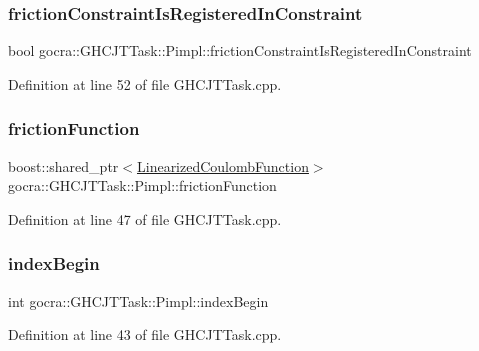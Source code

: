 \subsubsection{\texorpdfstring{friction\+Constraint\+Is\+Registered\+In\+Constraint}{frictionConstraintIsRegisteredInConstraint}}
{\footnotesize\ttfamily bool gocra\+::\+G\+H\+C\+J\+T\+Task\+::\+Pimpl\+::friction\+Constraint\+Is\+Registered\+In\+Constraint}



Definition at line 52 of file G\+H\+C\+J\+T\+Task.\+cpp.

\hypertarget{structgocra_1_1GHCJTTask_1_1Pimpl_a777d7f0a74a42508154b153dbc0a3b44}{}\label{structgocra_1_1GHCJTTask_1_1Pimpl_a777d7f0a74a42508154b153dbc0a3b44} 
\subsubsection{\texorpdfstring{friction\+Function}{frictionFunction}}
{\footnotesize\ttfamily boost\+::shared\+\_\+ptr$<$\hyperlink{classocra_1_1LinearizedCoulombFunction}{Linearized\+Coulomb\+Function}$>$ gocra\+::\+G\+H\+C\+J\+T\+Task\+::\+Pimpl\+::friction\+Function}



Definition at line 47 of file G\+H\+C\+J\+T\+Task.\+cpp.

\hypertarget{structgocra_1_1GHCJTTask_1_1Pimpl_a20542f3c613a7f9c0771c2b5ac0b38eb}{}\label{structgocra_1_1GHCJTTask_1_1Pimpl_a20542f3c613a7f9c0771c2b5ac0b38eb} 
\subsubsection{\texorpdfstring{index\+Begin}{indexBegin}}
{\footnotesize\ttfamily int gocra\+::\+G\+H\+C\+J\+T\+Task\+::\+Pimpl\+::index\+Begin}



Definition at line 43 of file G\+H\+C\+J\+T\+Task.\+cpp.

\hypertarget{structgocra_1_1GHCJTTask_1_1Pimpl_ada601a59aeedcd018df465a5e2e79e03}{}\label{structgocra_1_1GHCJTTask_1_1Pimpl_ada601a59aeedcd018df465a5e2e79e03} 
